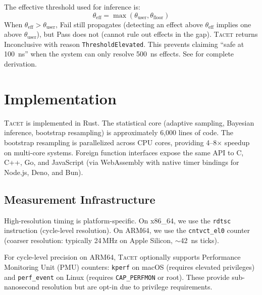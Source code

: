 \documentclass[letterpaper,twocolumn,10pt]{article}
\newcommand{\tacet}{\textsc{Tacet}\xspace}
\newcommand{\ns}[1]{\SI{#1}{\nano\second}}
\begin{document}
The effective threshold used for inference is:
\begin{equation}
    \theta_{\text{eff}} = \max(\theta_{\text{user}}, \theta_{\text{floor}})
\end{equation}
When $\theta_{\text{eff}} > \theta_{\text{user}}$, Fail still propagates (detecting
an effect above $\theta_{\text{eff}}$ implies one above $\theta_{\text{user}}$),
but Pass does not (cannot rule out effects in the gap). \tacet returns Inconclusive
with reason \texttt{ThresholdElevated}. This prevents claiming ``safe at \ns{100}''
when the system can only resolve \ns{500} effects. See  for
complete derivation.

\section{Implementation}
\label{sec:implementation}

\tacet is implemented in Rust. The statistical core (adaptive sampling, Bayesian
inference, bootstrap resampling) is approximately 6,000 lines of code. The
bootstrap resampling is parallelized across CPU cores, providing 4--8$\times$
speedup on multi-core systems. Foreign function interfaces expose the same API
to C, C++, Go, and JavaScript (via WebAssembly with native timer bindings for
Node.js, Deno, and Bun).

\subsection{Measurement Infrastructure}
\label{sec:implementation:measurement}

High-resolution timing is platform-specific. On x86\_64, we use the \texttt{rdtsc}
instruction (cycle-level resolution). On ARM64, we use the \texttt{cntvct\_el0}
counter (coarser resolution: typically 24\,MHz on Apple Silicon, $\sim$\ns{42} ticks).

For cycle-level precision on ARM64, \tacet optionally supports Performance Monitoring
Unit (PMU) counters: \texttt{kperf} on macOS (requires elevated privileges) and
\texttt{perf\_event} on Linux (requires \texttt{CAP\_PERFMON} or root). These provide
sub-nanosecond resolution but are opt-in due to privilege requirements.
\end{document}
